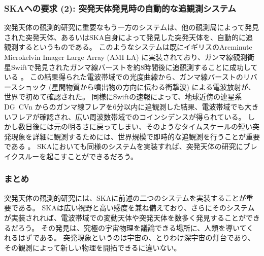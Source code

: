 \subsubsection{SKAへの要求 (2): 突発天体発見時の自動的な追観測システム}
突発天体の観測的研究に重要なもう一方のシステムは、他の観測局によって発見された突発天体、あるいはSKA自身によって発見した突発天体を、自動的に追観測するというものである。
このようなシステムは既にイギリスのArcminute Microkelvin Imager Large Array (AMI LA) に実装されており、ガンマ線観測衛星Swiftで発見されたガンマ線バーストを約8時間後に追観測することに成功している \citep{2013MNRAS.428.3114S,2014MNRAS.440.2059A}。
この結果得られた電波帯域での光度曲線から、ガンマ線バーストのリバースショック (星間物質から噴出物の方向に伝わる衝撃波) による電波放射が、世界で初めて確認された。
同様にSwiftの速報によって、地球近傍の連星系 DG~CVn からのガンマ線フレアを6分以内に追観測した結果、電波帯域でも大きいフレアが確認され、広い周波数帯域でのコインシデンスが得られている。
しかし数日後には元の明るさに戻ってしまい、そのようなタイムスケールの短い突発現象を詳細に観測するためには、世界規模で即時的な追観測を行うことが重要である \citep{2015MNRAS.446L..66F}。
SKAにおいても同様のシステムを実装すれば、突発天体の研究にブレイクスルーを起こすことができるだろう。

\subsubsection{まとめ}
突発天体の観測的研究には、SKAに前述の二つのシステムを実装することが重要である。
SKAは広い視野と高い感度を兼ね備えており、さらにそのシステムが実装されれば、電波帯域での変動天体や突発天体を数多く発見することができるだろう。
その発見は、究極の宇宙物理を議論できる場所に、人類を導いてくれるはずである。
突発現象というのは宇宙の、とりわけ深宇宙の灯台であり、その観測によって新しい物理を開拓できるに違いない。

